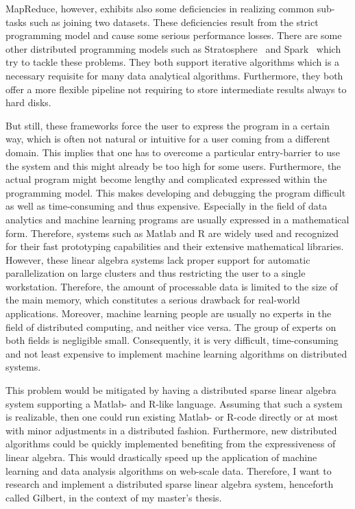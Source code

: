 MapReduce, however, exhibits also some deficiencies in realizing common sub-tasks such as joining two datasets.
These deficiencies result from the strict programming model and cause some serious performance losses.
There are some other distributed programming models such as Stratosphere~\cite{battre:2010a} and Spark~\cite{zaharia:2010a} which try to tackle these problems.
They both support iterative algorithms which is a necessary requisite for many data analytical algorithms.
Furthermore, they both offer a more flexible pipeline not requiring to store intermediate results always to hard disks.

But still, these frameworks force the user to express the program in a certain way, which is often not natural or intuitive for a user coming from a different domain.
This implies that one has to overcome a particular entry-barrier to use the system and this might already be too high for some users.
Furthermore, the actual program might become lengthy and complicated expressed within the programming model.
This makes developing and debugging the program difficult as well as time-consuming and thus expensive.
Especially in the field of data analytics and machine learning programs are usually expressed in a mathematical form.
Therefore, systems such as Matlab and R are widely used and recognized for their fast prototyping capabilities and their extensive mathematical libraries.
However, these linear algebra systems lack proper support for automatic parallelization on large clusters and thus restricting the user to a single workstation.
Therefore, the amount of processable data is limited to the size of the main memory, which constitutes a serious drawback for real-world applications.
Moreover, machine learning people are usually no experts in the field of distributed computing, and neither vice versa.
The group of experts on both fields is negligible small.
Consequently, it is very difficult, time-consuming and not least expensive to implement machine learning algorithms on distributed systems.

This problem would be mitigated by having a distributed sparse linear algebra system supporting a Matlab- and R-like language.
Assuming that such a system is realizable, then one could run existing Matlab- or R-code directly or at most with minor adjustments in a distributed fashion.
Furthermore, new distributed algorithms could be quickly implemented benefiting from the expressiveness of linear algebra.
This would drastically speed up the application of machine learning and data analysis algorithms on web-scale data.
Therefore, I want to research and implement a distributed sparse linear algebra system, henceforth called Gilbert, in the context of my master's thesis.